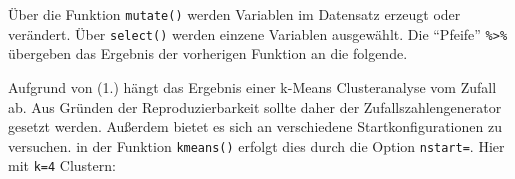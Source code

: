 \documentclass[12pt,]{book}
\makeatletter
\newenvironment{Shaded}{\begin{snugshade}}{\end{snugshade}}
\newcommand{\KeywordTok}[1]{\textcolor[rgb]{0.13,0.29,0.53}{\textbf{{#1}}}}
\newcommand{\DataTypeTok}[1]{\textcolor[rgb]{0.13,0.29,0.53}{{#1}}}
\newcommand{\StringTok}[1]{\textcolor[rgb]{0.31,0.60,0.02}{{#1}}}
\newcommand{\NormalTok}[1]{{#1}}
\newenvironment{kframe}{%
\medskip{}
\setlength{\fboxsep}{.8em}
 \def\at@end@of@kframe{}%
 \ifinner\ifhmode%
  \def\at@end@of@kframe{\end{minipage}}%
  \begin{minipage}{\columnwidth}%
 \fi\fi%
 \def\FrameCommand##1{\hskip\@totalleftmargin \hskip-\fboxsep
 \colorbox{shadecolor}{##1}\hskip-\fboxsep
     \hskip-\linewidth \hskip-\@totalleftmargin \hskip\columnwidth}%
 \MakeFramed {\advance\hsize-\width
   \@totalleftmargin\z@ \linewidth\hsize
   \@setminipage}}%
 {\par\unskip\endMakeFramed%
 \at@end@of@kframe}
\renewenvironment{Shaded}{\begin{kframe}}{\end{kframe}}
\makeatother
\begin{document}
\begin{Shaded}
\end{Shaded}

Über die Funktion \texttt{mutate()} werden Variablen im Datensatz
erzeugt oder verändert. Über \texttt{select()} werden einzene Variablen
ausgewählt. Die ``Pfeife'' \texttt{\%\textgreater{}\%} übergeben das
Ergebnis der vorherigen Funktion an die folgende.

Aufgrund von (1.) hängt das Ergebnis einer k-Means Clusteranalyse vom
Zufall ab. Aus Gründen der Reproduzierbarkeit sollte daher der
Zufallszahlengenerator gesetzt werden. Außerdem bietet es sich an
verschiedene Startkonfigurationen zu versuchen. in der Funktion
\texttt{kmeans()} erfolgt dies durch die Option \texttt{nstart=}. Hier
mit \texttt{k=4} Clustern:
\end{document}

